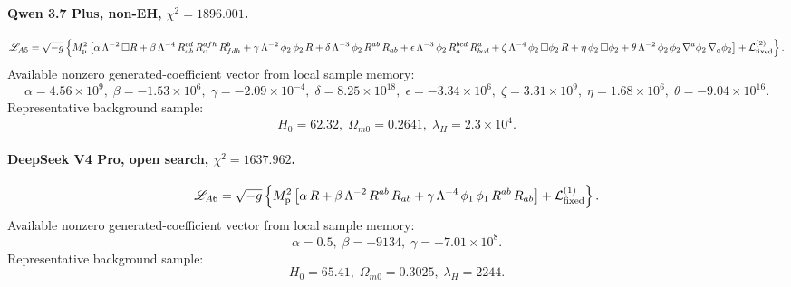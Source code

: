 \documentclass[aps,prd,twocolumn,superscriptaddress,nofootinbib,longbibliography]{revtex4-2}
\newcommand{\Mp}{M_{\rm p}}
\begin{document}
\begin{widetext}
\paragraph*{Qwen 3.7 Plus, non-EH, $\chi^2=1896.001$.}
\begin{equation}
\begin{split}
\mathscr{L}_{A5}
=\sqrt{-g}\left\{\Mp^2\left[\alpha\,\Lambda^{-2}\,\Box R + \beta\,\Lambda^{-4}\,R^{cd}_{ab} \, R^{afh}_{c} \, R^{b}_{fdh} + \gamma\,\Lambda^{-2}\,\phi_2 \, \phi_2 \, R + \delta\,\Lambda^{-3}\,\phi_2 \, R^{ab} \, R_{ab} + \epsilon\,\Lambda^{-3}\,\phi_2 \, R^{bcd}_{a} \, R^{a}_{bcd} + \zeta\,\Lambda^{-4}\,\phi_2 \, \Box \phi_2 \, R + \eta\,\phi_2 \, \Box \phi_2 + \theta\,\Lambda^{-2}\,\phi_2 \, \phi_2 \, \nabla^{a}\phi_2 \, \nabla_{a}\phi_2\right] + \mathcal{L}_{\rm fixed}^{(2)}\right\}.
\end{split}
\end{equation}
Available nonzero generated-coefficient vector from local sample memory:
\begin{equation}
\alpha=4.56\times10^{9},\; \beta=-1.53\times10^{6},\; \gamma=-2.09\times10^{-4},\; \delta=8.25\times10^{18},\; \epsilon=-3.34\times10^{6},\; \zeta=3.31\times10^{9},\; \eta=1.68\times10^{6},\; \theta=-9.04\times10^{16}.
\end{equation}
Representative background sample:
\begin{equation}
H_0=62.32,\; \Omega_{m0}=0.2641,\; \lambda_H=2.3\times10^{4}.
\end{equation}


\paragraph*{DeepSeek V4 Pro, open search, $\chi^2=1637.962$.}
\begin{equation}
\begin{split}
\mathscr{L}_{A6}
=\sqrt{-g}\left\{\Mp^2\left[\alpha\,R + \beta\,\Lambda^{-2}\,R^{ab} \, R_{ab} + \gamma\,\Lambda^{-4}\,\phi_1 \, \phi_1 \, R^{ab} \, R_{ab}\right] + \mathcal{L}_{\rm fixed}^{(1)}\right\}.
\end{split}
\end{equation}
Available nonzero generated-coefficient vector from local sample memory:
\begin{equation}
\alpha=0.5,\; \beta=-9134,\; \gamma=-7.01\times10^{8}.
\end{equation}
Representative background sample:
\begin{equation}
H_0=65.41,\; \Omega_{m0}=0.3025,\; \lambda_H=2244.
\end{equation}



\end{widetext}
\end{document}
